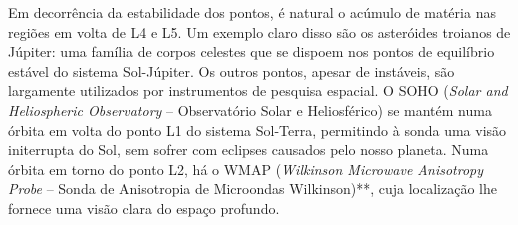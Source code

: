 Em decorrência da estabilidade dos pontos, é natural o acúmulo de matéria nas regiões em volta de L4 e L5. Um exemplo claro disso são os asteróides troianos de Júpiter: uma família de corpos celestes que se dispoem nos pontos de equilíbrio estável do sistema Sol-Júpiter. Os outros pontos, apesar de instáveis, são largamente utilizados por instrumentos de pesquisa espacial. O SOHO (\emph{Solar and Heliospheric Observatory} -- Observatório Solar e Heliosférico) \cite{} se mantém numa órbita em volta do ponto L1 do sistema Sol-Terra, permitindo à sonda uma visão initerrupta do Sol, sem sofrer com eclipses causados pelo nosso planeta. Numa órbita em torno do ponto L2, há o WMAP (\emph{Wilkinson Microwave Anisotropy Probe} -- Sonda de Anisotropia de Microondas Wilkinson)**, cuja localização lhe fornece uma visão clara do espaço profundo.



